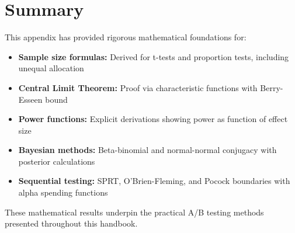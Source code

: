 \section{Summary}

This appendix has provided rigorous mathematical foundations for:

\begin{itemize}
    \item \textbf{Sample size formulas:} Derived for t-tests and proportion tests, including unequal allocation
    \item \textbf{Central Limit Theorem:} Proof via characteristic functions with Berry-Esseen bound
    \item \textbf{Power functions:} Explicit derivations showing power as function of effect size
    \item \textbf{Bayesian methods:} Beta-binomial and normal-normal conjugacy with posterior calculations
    \item \textbf{Sequential testing:} SPRT, O'Brien-Fleming, and Pocock boundaries with alpha spending functions
\end{itemize}

These mathematical results underpin the practical A/B testing methods presented throughout this handbook.
